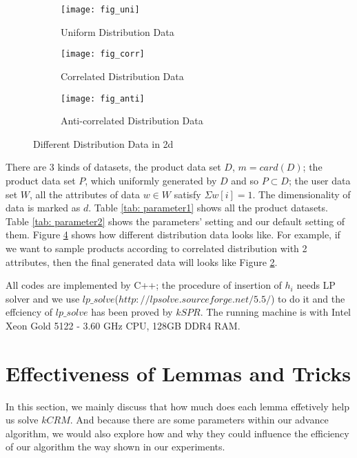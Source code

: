\begin{figure}[hbt!]
  \centering
  \begin{subfigure}[b]{0.45\linewidth}
    \texttt{[image: fig\_uni]}
    \caption{Uniform Distribution Data}
    \label{fig_uni}
  \end{subfigure}
  \begin{subfigure}[b]{0.45\linewidth}
    \texttt{[image: fig\_corr]}
    \caption{Correlated Distribution Data}
    \label{fig_corr}
  \end{subfigure}
  \begin{subfigure}[b]{0.45\linewidth}
    \texttt{[image: fig\_anti]}
    \caption{Anti-correlated Distribution Data}
    \label{fig_anti}
  \end{subfigure}
  \caption{Different Distribution Data in 2d}
  \label{data distribution}
\end{figure}

There are 3 kinds of datasets, the product data set $D$, $m=card(D)$; 
the product data set $P$, which uniformly generated by $D$ and so $P\subset D$;
the user data set $W$, all the attributes of data $w\in W$ satisfy $\Sigma w[i]=1$. 
The dimensionality of data is marked as $d$. 
Table \ref{tab: parameter1} shows all the product datasets. 
Table \ref{tab: parameter2} shows the parameters' setting and 
our default setting of them. Figure \ref{data distribution} shows how different
distribution data looks like. For example, if we want to sample products according
to correlated distribution with 2 attributes, then the final generated data will
looks like Figure \ref{fig_corr}.


All codes are implemented by C++; 
the procedure of insertion of $h_i$ needs LP solver and we use $lp\_solve$($http://lpsolve.sourceforge.net/5.5/$)
 to do it and the effciency of $lp\_solve$ has been proved by $kSPR$.  
The running machine is with Intel Xeon Gold 5122 - 3.60 GHz CPU, 128GB DDR4 RAM. 

\section{Effectiveness of Lemmas and Tricks}
In this section, we mainly discuss that how much does each lemma effetively help us
solve $kCRM$. And because there are some parameters within our advance algorithm, 
we would also explore how and why they could influence the efficiency of our algorithm
the way shown in our experiments.



